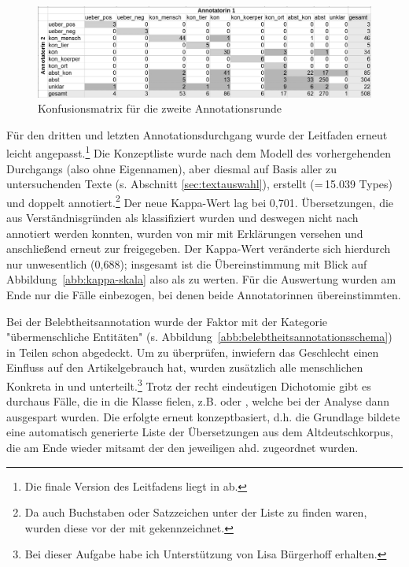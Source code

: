 \begin{figure}
\begin{center}
  \includegraphics[width=12 cm]{images/confusionsmatrix-neu-sw.jpg}
\caption {Konfusionsmatrix für die zweite Annotationsrunde}
\label{abb:confusion}
\end{center}
\end{figure} 

Für den dritten und letzten Annotationsdurchgang  wurde der Leitfaden erneut leicht angepasst.\footnote{Die finale Version des Leitfadens liegt in \textcite{HZKYL4_2020} ab.} Die Konzeptliste wurde nach dem Modell des vorhergehenden Durchgangs (also ohne  Eigennamen), aber diesmal auf Basis aller zu untersuchenden Texte (s. Abschnitt \ref{sec:textauswahl}), erstellt (=\,15.039 Types)  und doppelt  annotiert.\footnote{Da auch Buchstaben oder Satzzeichen unter der Liste zu finden waren, wurden diese vor der  mit  gekennzeichnet.} Der neue Kappa-Wert lag bei 0,701. Übersetzungen, die aus Verständnisgründen als  klassifiziert wurden und deswegen nicht nach  annotiert  werden konnten, wurden von mir mit Erklärungen versehen und anschließend erneut zur  freigegeben. Der Kappa-Wert veränderte sich hierdurch nur unwesentlich (0,688); insgesamt ist die Übereinstimmung mit Blick auf Abbildung~\ref{abb:kappa-skala} also als   zu werten. Für die Auswertung wurden am Ende nur die Fälle einbezogen, bei denen beide Annotatorinnen übereinstimmten.


Bei der Belebtheitsannotation wurde der Faktor  mit der Kategorie "übermenschliche Entitäten" (s. Abbildung~\ref{abb:belebtheitsannotationsschema}) in Teilen schon abgedeckt. Um zu überprüfen, inwiefern das Geschlecht einen Einfluss auf den Artikelgebrauch hat, wurden zusätzlich alle menschlichen Konkreta  in  und  unterteilt.\footnote{Bei dieser Aufgabe habe ich Unterstützung von Lisa Bürgerhoff erhalten.} 
Trotz der recht eindeutigen Dichotomie gibt es durchaus Fälle, die in die Klasse  fielen, z.B.  oder , welche bei der Analyse dann ausgespart wurden.  Die  erfolgte erneut konzeptbasiert, d.h. die Grundlage bildete eine automatisch generierte Liste der  Übersetzungen aus dem  Altdeutschkorpus, die am Ende wieder mitsamt der  den jeweiligen ahd.  zugeordnet wurden. 

